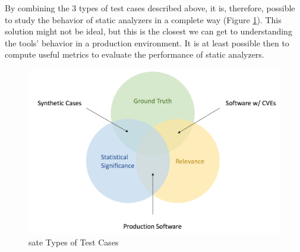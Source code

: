 By combining the 3 types of test cases described above, it is, therefore, possible to study the behavior of static analyzers in a complete way (Figure \ref{fig:types-of-test-cases}). This solution might not be ideal, but this is the closest we can get to understanding the tools' behavior in a production environment. It is at least possible then to compute useful metrics to evaluate the performance of static analyzers.

\vspace{1.5cm}

\begin{figure}[ht]
    \centering
    \includegraphics[scale=0.49]{figures/types-of-test-cases}
    \caption{\gls{sate} Types of Test Cases \cite{okun2016sate}}
    \label{fig:types-of-test-cases}
\end{figure}